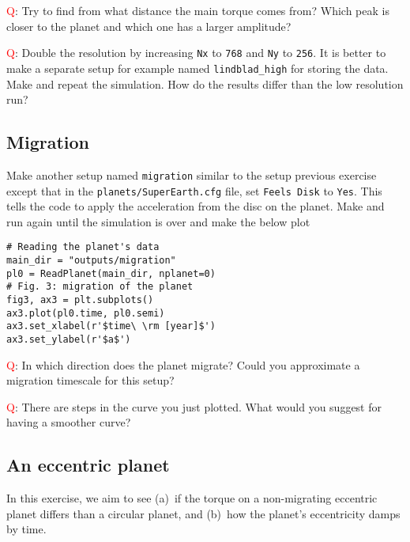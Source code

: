 \documentclass[14pt]{scrartcl}
\begin{document}
\textcolor{red}{Q}: Try to find from what distance the main torque comes from? Which peak is closer to the planet and which one has a larger amplitude?

\textcolor{red}{Q}: Double the resolution by increasing \texttt{Nx} to \texttt{768} and \texttt{Ny} to \texttt{256}. It is better to make a separate setup for example named \texttt{lindblad\_high} for storing the data. Make and repeat the simulation. How do the results differ than the low resolution run?

\subsection{Migration} \label{subsec:migrating}	
Make another setup named \texttt{migration} similar to the setup previous exercise except that in the \texttt{planets/SuperEarth.cfg} file, set \texttt{Feels Disk} to \texttt{Yes}. This tells the code to apply the acceleration from the disc on the planet. Make and run again until the simulation is over and make the below plot
\begin{verbatim}
# Reading the planet's data
main_dir = "outputs/migration"
pl0 = ReadPlanet(main_dir, nplanet=0)
# Fig. 3: migration of the planet
fig3, ax3 = plt.subplots()
ax3.plot(pl0.time, pl0.semi)
ax3.set_xlabel(r'$time\ \rm [year]$')
ax3.set_ylabel(r'$a$')
\end{verbatim}

\textcolor{red}{Q}: In which direction does the planet migrate? Could you approximate a migration timescale for this setup?

\textcolor{red}{Q}: There are steps in the curve you just plotted. What would you suggest for having a smoother curve?

\subsection{An eccentric planet} \label{subsec:ecc}	
In this exercise, we aim to see (a)~if the torque on a non-migrating eccentric planet differs than a circular planet, and (b)~how the planet's eccentricity damps by time.
\end{document}
